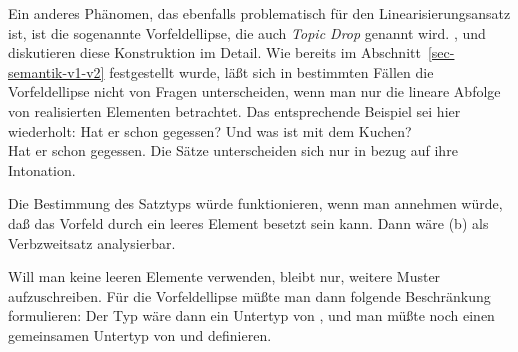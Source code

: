 Ein anderes Phänomen, das ebenfalls problematisch für den Linearisierungsansatz ist,
ist die sogenannte Vorfeldellipse, die auch \emph{Topic Drop} genannt
wird. \citet{Huang84},
\citet{Fries88b} und \citet{Hoffmann97a} diskutieren diese Konstruktion im Detail.
Wie bereits im Abschnitt~\ref{sec-semantik-v1-v2} festgestellt wurde, läßt sich in bestimmten
Fällen die Vorfeldellipse nicht von Fragen unterscheiden, wenn man nur die lineare Abfolge
von realisierten Elementen betrachtet. Das entsprechende Beispiel sei hier wiederholt:
\eal
\label{bsp-hat-er-gegessen-zwei}
\ex Hat er schon gegessen?
\ex Und was ist mit dem Kuchen?\\
    Hat er schon gegessen.
\zl
Die Sätze unterscheiden sich nur in bezug auf ihre Intonation.

Die Bestimmung des Satztyps würde funktionieren, wenn man annehmen würde, daß das Vorfeld
durch ein leeres Element besetzt sein kann. Dann wäre (b) als Verbzweitsatz analysierbar.

Will man keine leeren Elemente verwenden, bleibt nur, weitere Muster aufzuschreiben. Für die Vorfeldellipse
müßte man dann \zb folgende Beschränkung formulieren:
\ea
{} \impl {}
\z
Der Typ  wäre dann ein Untertyp von , und man müßte
noch einen gemeinsamen Untertyp von  und  definieren.

